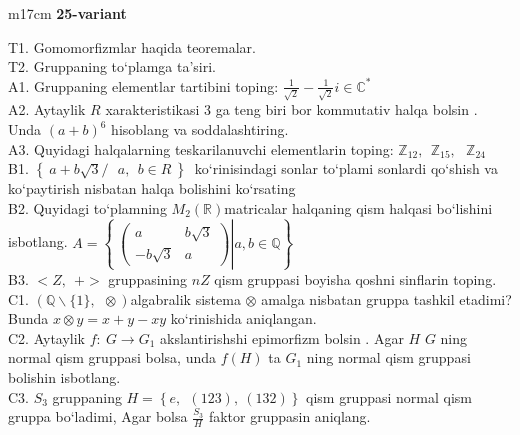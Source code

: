 \documentclass{article}
\begin{document}
\begin{tabular}{m{17cm}}
\textbf{25-variant}
\newline

T1. Gomomorfizmlar haqida teoremalar. \\
T2. Gruppaning to`plamga ta'siri. \\
A1. Gruppaning elementlar tartibini toping: \(\frac{1}{\sqrt{2}} - \frac{1}{\sqrt{2}}i \in \mathbb{C}^{*}\) \\
A2. Aytaylik \(R\) xarakteristikasi 3 ga teng biri bor kommutativ halqa bo\textquotesingle lsin . Unda \((a + b)^{6}\) hisoblang va soddalashtiring. \\
A3. Quyidagi halqalarning teskarilanuvchi elementlarin toping: \(\mathbb{Z}_{12},\ \ \mathbb{Z}_{15},\ \ \ \mathbb{Z}_{24}\) \\
B1. \(\left\{ \left. \ a + b\sqrt{3}/\ \ \ a,\ \ b \in R\  \right\} \right.\ \) ko`rinisindagi sonlar to`plami sonlardi qo`shish va ko`paytirish nisbatan halqa bolishini ko`rsating \\
B2. Quyidagi to`plamning \(M_{2}(\mathbb{R})\)matricalar halqaning qism halqasi bo`lishini isbotlang. \(A = \left\{ \left. \ \begin{pmatrix}
a & b\sqrt{3} \\
 - b\sqrt{3} & a
\end{pmatrix} \right|a,b\mathbb{\in Q} \right\}\) \\
B3. \(< Z,\ \  + >\) gruppasining \(nZ\) qism gruppasi boyisha qo\textquotesingle shni sinflarin toping. \\
C1. \(\left( \mathbb{Q}\backslash\{ 1\},\ \  \otimes \right)\)algabralik sistema \(\otimes\) amalga nisbatan gruppa tashkil etadimi? Bunda \(x \otimes y = x + y - xy\) ko`rinishida aniqlangan. \\
C2. Aytaylik \(f:\ G \rightarrow G_{1}\) akslantirishshi epimorfizm bo\textquotesingle lsin . Agar \(H\) \(G\) ning normal qism gruppasi bolsa, unda \(f(H)\) ta \(G_{1}\) ning normal qism gruppasi bolishin isbotlang. \\
C3. \(S_{3}\) gruppaning \(H = \left\{ e,\ \ (123),\ (132) \right\}\) qism gruppasi normal qism gruppa bo`ladimi, Agar bolsa \(\frac{S_{3}}{H}\) faktor gruppasin aniqlang. \\

\end{tabular}
\vspace{1cm}
\end{document}
